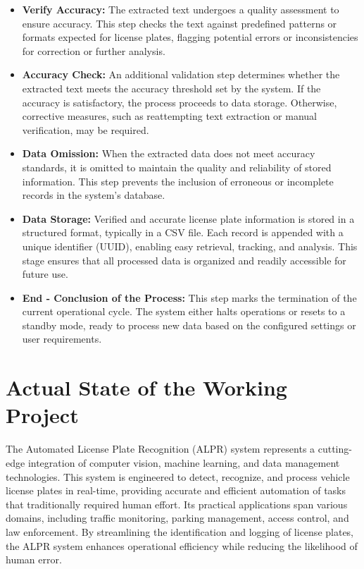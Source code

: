 \begin{itemize}
	\item \textbf{Verify Accuracy:} The extracted text undergoes a quality assessment to ensure accuracy. This step checks the text against predefined patterns or formats expected for license plates, flagging potential errors or inconsistencies for correction or further analysis.
	
	\item \textbf{Accuracy Check:} An additional validation step determines whether the extracted text meets the accuracy threshold set by the system. If the accuracy is satisfactory, the process proceeds to data storage. Otherwise, corrective measures, such as reattempting text extraction or manual verification, may be required.
	
	\item \textbf{Data Omission:} When the extracted data does not meet accuracy standards, it is omitted to maintain the quality and reliability of stored information. This step prevents the inclusion of erroneous or incomplete records in the system's database.
	
	\item \textbf{Data Storage:} Verified and accurate license plate information is stored in a structured format, typically in a CSV file. Each record is appended with a unique identifier (UUID), enabling easy retrieval, tracking, and analysis. This stage ensures that all processed data is organized and readily accessible for future use.
	
	\item \textbf{End - Conclusion of the Process:} This step marks the termination of the current operational cycle. The system either halts operations or resets to a standby mode, ready to process new data based on the configured settings or user requirements.
\end{itemize}


\section{Actual State of the Working Project}

The Automated License Plate Recognition (ALPR) system represents a cutting-edge integration of computer vision, machine learning, and data management technologies. This system is engineered to detect, recognize, and process vehicle license plates in real-time, providing accurate and efficient automation of tasks that traditionally required human effort. Its practical applications span various domains, including traffic monitoring, parking management, access control, and law enforcement. By streamlining the identification and logging of license plates, the ALPR system enhances operational efficiency while reducing the likelihood of human error.

